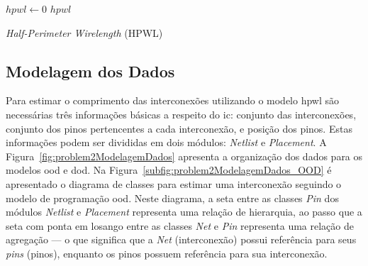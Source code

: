 \begin{algorithm}[h!t]
	\LinesNumbered
    $hpwl \gets 0$\; \label{alg:problem2:var:inithpwl}
  	 \label{alg:problem2:var:endForNets}
  	\Return $hpwl$\; \label{alg:problem2:var:retorno}
	\caption{\textit{Half-Perimeter Wirelength} (HPWL)} 
	\label{alg:problem2}
\end{algorithm}

\subsection{Modelagem dos Dados}
\label{subsec:modelagemDadosProblem2}

Para estimar o comprimento das interconexões utilizando o modelo \ac{hpwl} são necessárias três informações básicas a respeito do \ac{ic}: conjunto das interconexões, conjunto dos pinos pertencentes a cada interconexão, e posição dos pinos.
Estas informações podem ser divididas em dois módulos: \textit{Netlist} e \textit{Placement}.
A Figura~\ref{fig:problem2ModelagemDados} apresenta a organização dos dados para os modelos \ac{ood} e \ac{dod}.
Na Figura~\ref{subfig:problem2ModelagemDados_OOD} é apresentado o diagrama de classes para estimar uma interconexão seguindo o modelo de programação \ac{ood}.
Neste diagrama, a seta entre as classes \textit{Pin} dos módulos \textit{Netlist} e \textit{Placement} representa uma relação de hierarquia, ao passo que a seta com ponta em losango entre as classes \textit{Net} e \textit{Pin} representa uma relação de agregação --- o que significa que a \textit{Net} (interconexão) possui referência para seus \textit{pins} (pinos), enquanto os pinos possuem referência para sua interconexão.

